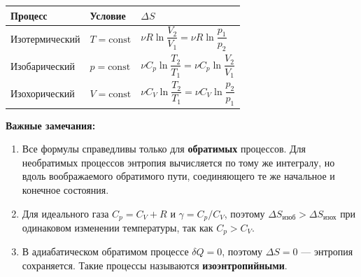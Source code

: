 \begin{property}
\begin{center}
\begin{tabular}{|l|l|l|}
\hline
Процесс & Условие & $\Delta S$ \\
\hline
Изотермический & $T=\text{const}$ & $\nu R \ln\dfrac{V_2}{V_1} = \nu R \ln\dfrac{p_1}{p_2}$ \\
\hline
Изобарический & $p=\text{const}$ & $\nu C_p \ln\dfrac{T_2}{T_1} = \nu C_p \ln\dfrac{V_2}{V_1}$ \\
\hline
Изохорический & $V=\text{const}$ & $\nu C_V \ln\dfrac{T_2}{T_1} = \nu C_V \ln\dfrac{p_2}{p_1}$ \\
\hline
\end{tabular}
\end{center}
\end{property}

\begin{remark}
\textbf{Важные замечания:}
\begin{enumerate}
    \item Все формулы справедливы только для \textbf{обратимых} процессов. Для необратимых процессов энтропия вычисляется по тому же интегралу, но вдоль воображаемого обратимого пути, соединяющего те же начальное и конечное состояния.
    \item Для идеального газа $C_p = C_V + R$ и $\gamma = C_p/C_V$, поэтому $\Delta S_{\text{изоб}} > \Delta S_{\text{изох}}$ при одинаковом изменении температуры, так как $C_p > C_V$.
    \item В адиабатическом обратимом процессе $\delta Q = 0$, поэтому $\Delta S = 0$ --- энтропия сохраняется. Такие процессы называются \textbf{изоэнтропийными}.
\end{enumerate}
\end{remark}
